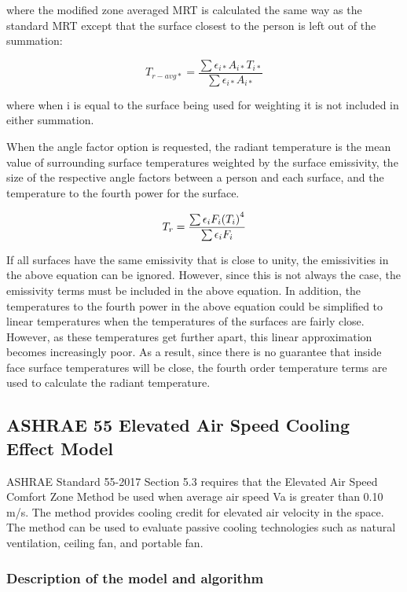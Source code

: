 where the modified zone averaged MRT is calculated the same way as the standard MRT except that the surface closest to the person is left out of the summation:

\begin{equation}
{T_{r - avg*}} = \frac{\sum{{{\epsilon}_{i*}}{{A}_{i*}}{{T}_{i*}}}}{\sum{{{\epsilon}_{i*}}{{A}_{i*}}}}
\end{equation}

where when i is equal to the surface being used for weighting it is not included in either summation.

When the angle factor option is requested, the radiant temperature is the mean value of surrounding surface temperatures weighted by the surface emissivity, the size of the respective angle factors between a person and each surface, and the temperature to the fourth power for the surface.

\begin{equation}
{T_r} = \frac{\sum{{\epsilon_{i}}{F_{i}}{\PB{{T_{i}}}^4}}}{\sum{{\epsilon_{i}}{F_{i}}}}
\end{equation}

If all surfaces have the same emissivity that is close to unity, the emissivities in the above equation can be ignored.  However, since this is not always the case, the emissivity terms must be included in the above equation.  In addition, the temperatures to the fourth power in the above equation could be simplified to linear temperatures when the temperatures of the surfaces are fairly close.  However, as these temperatures get further apart, this linear approximation becomes increasingly poor.  As a result, since there is no guarantee that inside face surface temperatures will be close, the fourth order temperature terms are used to calculate the radiant temperature.

\subsection{ASHRAE 55 Elevated Air Speed Cooling Effect Model}\label{elevated-air-speed-ce-model}

ASHRAE Standard 55-2017 Section 5.3 requires that the Elevated Air Speed Comfort Zone Method be used when average air speed Va is greater than 0.10 m/s. The method provides cooling credit for elevated air velocity in the space. The method can be used to evaluate passive cooling technologies such as natural ventilation, ceiling fan, and portable fan.

\subsubsection{Description of the model and algorithm}\label{description-of-the-model-and-algorithm-4}

